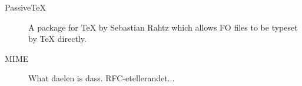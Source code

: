 \begin{description}
\item[PassiveTeX] A package for {\TeX} by Sebastian Rahtz which allows
  FO files to be typeset by {\TeX} directly.

\item[MIME] \textsf{What daelen is dass. RFC-etellerandet...}
\end{description}

  

    
